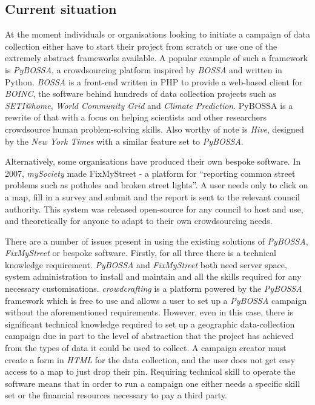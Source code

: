 \documentclass{article}
\begin{document}
		\subsection{Current situation}
		At the moment individuals or organisations looking to initiate a campaign of data collection either have to start their project from scratch or use one of the extremely abstract frameworks available. A popular example of such a framework is \emph{PyBOSSA}, a crowdsourcing platform inspired by \emph{BOSSA}\cite{_welcome_????} and written in Python. \emph{BOSSA} is a front-end written in PHP to provide a web-based client for \emph{BOINC}, the software behind hundreds of data collection projects such as \emph{SETI@home}, \emph{World Community Grid} and \emph{Climate Prediction}\cite{_boinc_2015}. PyBOSSA is a rewrite of that with a focus on helping scientists and other researchers crowdsource human problem-solving skills. Also worthy of note is \emph{Hive}, designed by the \emph{New York Times} with a similar feature set to \emph{PyBOSSA}\cite{_nytlabs/hive_????}.

		Alternatively, some organisations have produced their own bespoke software. In 2007, \emph{mySociety} made FixMyStreet - a platform for ``reporting common street problems such as potholes and broken street lights''\cite{_mysociety/fixmystreet_2015}. A user needs only to click on a map, fill in a survey and submit and the report is sent to the relevant council authority. This system was released open-source for any council to host and use, and theoretically for anyone to adapt to their own crowdsourcing needs.

		There are a number of issues present in using the existing solutions of \emph{PyBOSSA}, \emph{FixMyStreet} or bespoke software. Firstly, for all three there is a technical knowledge requirement. \emph{PyBOSSA} and \emph{FixMyStreet} both need server space, system administration to install and maintain and all the skills required for any necessary customisations. \emph{crowdcrafting} is a platform powered by the \emph{PyBOSSA} framework which is free to use and allows a user to set up a \emph{PyBOSSA} campaign without the aforementioned requirements. However, even in this case, there is significant technical knowledge required to set up a geographic data-collection campaign due in part to the level of abstraction that the project has achieved from the types of data it could be used to collect. A campaign creator must create a form in \emph{HTML} for the data collection, and the user does not get easy access to a map to just drop their pin. Requiring technical skill to operate the software means that in order to run a campaign one either needs a specific skill set or the financial resources necessary to pay a third party.
\end{document}

